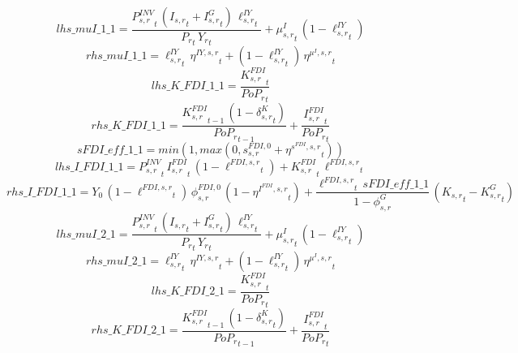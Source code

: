 \begin{dmath*}
lhs\_muI\_1\_1 = \frac{{{P^{INV}_{s,r}}}_{t}\, \left({{I_{s,r}}}_{t}+{{I^G_{s,r}}}_{t}\right)\, {{\ell^{IY}_{s,r}}}_{t}}{{{P_{r}}}_{t}\, {{Y_r}}_{t}}+{{\mu^{I}_{s,r}}}_{t}\, \left(1-{{\ell^{IY}_{s,r}}}_{t}\right)
\end{dmath*}
\begin{dmath*}
rhs\_muI\_1\_1 = {{\ell^{IY}_{s,r}}}_{t}\, {{\eta^{IY,s,r}}}_{t}+\left(1-{{\ell^{IY}_{s,r}}}_{t}\right)\, {{\eta^{\mu^{I},s,r}}}_{t}
\end{dmath*}
\begin{dmath*}
lhs\_K\_FDI\_1\_1 = \frac{{{K^{FDI}_{s,r}}}_{t}}{{{PoP_r}}_{t}}
\end{dmath*}
\begin{dmath*}
rhs\_K\_FDI\_1\_1 = \frac{{{K^{FDI}_{s,r}}}_{t-1}\, \left(1-{{\delta^{K}_{s,r}}}_{t}\right)}{{{PoP_r}}_{t-1}}+\frac{{{I^{FDI}_{s,r}}}_{t}}{{{PoP_r}}_{t}}
\end{dmath*}
\begin{dmath*}
sFDI\_eff\_1\_1 = min(1,max(0,{{s^{FDI,0}_{s,r}}}+{{\eta^{s^{FDI},s,r}}}_{t}))
\end{dmath*}
\begin{dmath*}
lhs\_I\_FDI\_1\_1 = {{P^{INV}_{s,r}}}_{t}\, {{I^{FDI}_{s,r}}}_{t}\, \left(1-{{\ell^{FDI,s,r}}}_{t}\right)+{{K^{FDI}_{s,r}}}_{t}\, {{\ell^{FDI,s,r}}}_{t}
\end{dmath*}
\begin{dmath*}
rhs\_I\_FDI\_1\_1 = {{Y_0}}\, \left(1-{{\ell^{FDI,s,r}}}_{t}\right)\, {{\phi^{FDI,0}_{s,r}}}\, \left(1-{{\eta^{I^{FDI},s,r}}}_{t}\right)+\frac{{{\ell^{FDI,s,r}}}_{t}\, {sFDI\_eff\_1\_1}}{1-{{\phi^{G}_{s,r}}}}\, \left({{K_{s,r}}}_{t}-{{K^G_{s,r}}}_{t}\right)
\end{dmath*}
\begin{dmath*}
lhs\_muI\_2\_1 = \frac{{{P^{INV}_{s,r}}}_{t}\, \left({{I_{s,r}}}_{t}+{{I^G_{s,r}}}_{t}\right)\, {{\ell^{IY}_{s,r}}}_{t}}{{{P_{r}}}_{t}\, {{Y_r}}_{t}}+{{\mu^{I}_{s,r}}}_{t}\, \left(1-{{\ell^{IY}_{s,r}}}_{t}\right)
\end{dmath*}
\begin{dmath*}
rhs\_muI\_2\_1 = {{\ell^{IY}_{s,r}}}_{t}\, {{\eta^{IY,s,r}}}_{t}+\left(1-{{\ell^{IY}_{s,r}}}_{t}\right)\, {{\eta^{\mu^{I},s,r}}}_{t}
\end{dmath*}
\begin{dmath*}
lhs\_K\_FDI\_2\_1 = \frac{{{K^{FDI}_{s,r}}}_{t}}{{{PoP_r}}_{t}}
\end{dmath*}
\begin{dmath*}
rhs\_K\_FDI\_2\_1 = \frac{{{K^{FDI}_{s,r}}}_{t-1}\, \left(1-{{\delta^{K}_{s,r}}}_{t}\right)}{{{PoP_r}}_{t-1}}+\frac{{{I^{FDI}_{s,r}}}_{t}}{{{PoP_r}}_{t}}
\end{dmath*}
